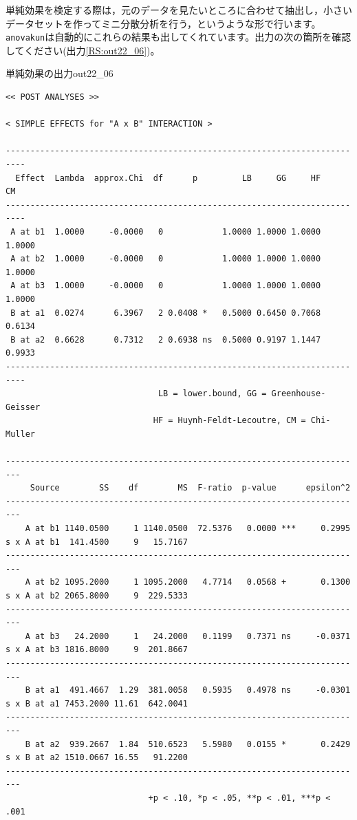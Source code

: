 \documentclass{ltjbook}
\begin{document}
単純効果を検定する際は，元のデータを見たいところに合わせて抽出し，小さいデータセットを作ってミニ分散分析を行う，というような形で行います。\verb|anovakun|は自動的にこれらの結果も出してくれています。出力の次の箇所を確認してください(出力\ref{RS:out22_06})。

\begin{Rscreen}{単純効果の出力}{out22_06}
\begin{verbatim}
<< POST ANALYSES >>

< SIMPLE EFFECTS for "A x B" INTERACTION >

--------------------------------------------------------------------------
  Effect  Lambda  approx.Chi  df      p         LB     GG     HF     CM 
--------------------------------------------------------------------------
 A at b1  1.0000     -0.0000   0            1.0000 1.0000 1.0000 1.0000 
 A at b2  1.0000     -0.0000   0            1.0000 1.0000 1.0000 1.0000 
 A at b3  1.0000     -0.0000   0            1.0000 1.0000 1.0000 1.0000 
 B at a1  0.0274      6.3967   2 0.0408 *   0.5000 0.6450 0.7068 0.6134 
 B at a2  0.6628      0.7312   2 0.6938 ns  0.5000 0.9197 1.1447 0.9933 
--------------------------------------------------------------------------
                               LB = lower.bound, GG = Greenhouse-Geisser
                              HF = Huynh-Feldt-Lecoutre, CM = Chi-Muller

-------------------------------------------------------------------------
     Source        SS    df        MS  F-ratio  p-value      epsilon^2 
-------------------------------------------------------------------------
    A at b1 1140.0500     1 1140.0500  72.5376   0.0000 ***     0.2995 
s x A at b1  141.4500     9   15.7167                                  
-------------------------------------------------------------------------
    A at b2 1095.2000     1 1095.2000   4.7714   0.0568 +       0.1300 
s x A at b2 2065.8000     9  229.5333                                  
-------------------------------------------------------------------------
    A at b3   24.2000     1   24.2000   0.1199   0.7371 ns     -0.0371 
s x A at b3 1816.8000     9  201.8667                                  
-------------------------------------------------------------------------
    B at a1  491.4667  1.29  381.0058   0.5935   0.4978 ns     -0.0301 
s x B at a1 7453.2000 11.61  642.0041                                  
-------------------------------------------------------------------------
    B at a2  939.2667  1.84  510.6523   5.5980   0.0155 *       0.2429 
s x B at a2 1510.0667 16.55   91.2200                                  
-------------------------------------------------------------------------
                             +p < .10, *p < .05, **p < .01, ***p < .001
\end{verbatim}
\end{Rscreen}
\end{document}
